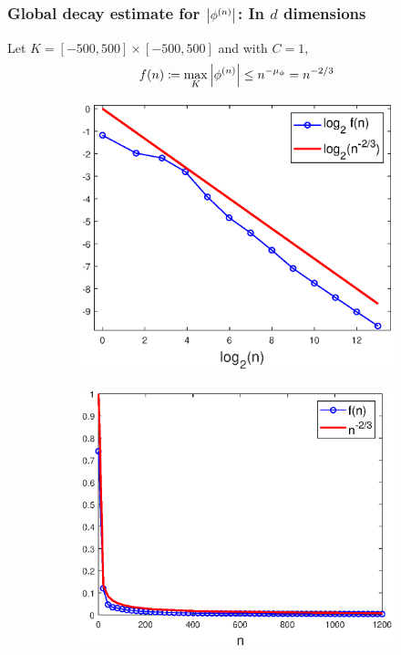 \documentclass{beamer}
\theoremstyle{definition}
\begin{document}
\begin{frame}
\frametitle{Global decay estimate for $\abs{\phi^{(n)}}$: In $d$ dimensions}

Let $K = [-500,500]\times[-500,500]$ and with $C=1$,
\begin{equation*}
f(n)\coloneqq\max_{K}\abs{\phi^{(n)}}\leq n^{-\mu_\phi}= n^{-2/3}
\end{equation*}
\begin{figure}[!htb]
\vspace{-10pt}
\begin{subfigure}{0.49\textwidth}
\centering
\includegraphics[width=\textwidth]{Fig9a.eps}
\end{subfigure}
\begin{subfigure}{0.49\textwidth}
\centering
\includegraphics[width=\textwidth]{Fig9b.eps}
\end{subfigure}
\label{fig:Conv_Pwr_3}
\end{figure}

\end{frame}
\end{document}
